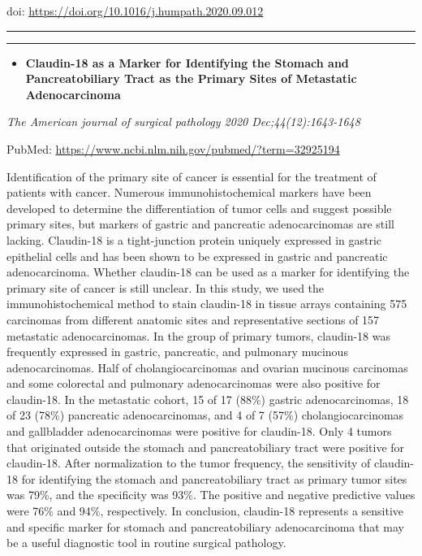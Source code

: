 \documentclass[
]{article}
\providecommand{\tightlist}{%
  \setlength{\itemsep}{0pt}\setlength{\parskip}{0pt}}
\begin{document}
doi: \url{https://doi.org/10.1016/j.humpath.2020.09.012}

\begin{center}\rule{0.5\linewidth}{0.5pt}\end{center}

\begin{center}\rule{0.5\linewidth}{0.5pt}\end{center}

\begin{itemize}
\tightlist
\item
  \textbf{Claudin-18 as a Marker for Identifying the Stomach and
  Pancreatobiliary Tract as the Primary Sites of Metastatic
  Adenocarcinoma}
\end{itemize}

\emph{The American journal of surgical pathology 2020
Dec;44(12):1643-1648}

PubMed: \url{https://www.ncbi.nlm.nih.gov/pubmed/?term=32925194}

Identification of the primary site of cancer is essential for the
treatment of patients with cancer. Numerous immunohistochemical markers
have been developed to determine the differentiation of tumor cells and
suggest possible primary sites, but markers of gastric and pancreatic
adenocarcinomas are still lacking. Claudin-18 is a tight-junction
protein uniquely expressed in gastric epithelial cells and has been
shown to be expressed in gastric and pancreatic adenocarcinoma. Whether
claudin-18 can be used as a marker for identifying the primary site of
cancer is still unclear. In this study, we used the immunohistochemical
method to stain claudin-18 in tissue arrays containing 575 carcinomas
from different anatomic sites and representative sections of 157
metastatic adenocarcinomas. In the group of primary tumors, claudin-18
was frequently expressed in gastric, pancreatic, and pulmonary mucinous
adenocarcinomas. Half of cholangiocarcinomas and ovarian mucinous
carcinomas and some colorectal and pulmonary adenocarcinomas were also
positive for claudin-18. In the metastatic cohort, 15 of 17 (88\%)
gastric adenocarcinomas, 18 of 23 (78\%) pancreatic adenocarcinomas, and
4 of 7 (57\%) cholangiocarcinomas and gallbladder adenocarcinomas were
positive for claudin-18. Only 4 tumors that originated outside the
stomach and pancreatobiliary tract were positive for claudin-18. After
normalization to the tumor frequency, the sensitivity of claudin-18 for
identifying the stomach and pancreatobiliary tract as primary tumor
sites was 79\%, and the specificity was 93\%. The positive and negative
predictive values were 76\% and 94\%, respectively. In conclusion,
claudin-18 represents a sensitive and specific marker for stomach and
pancreatobiliary adenocarcinoma that may be a useful diagnostic tool in
routine surgical pathology.
\end{document}
